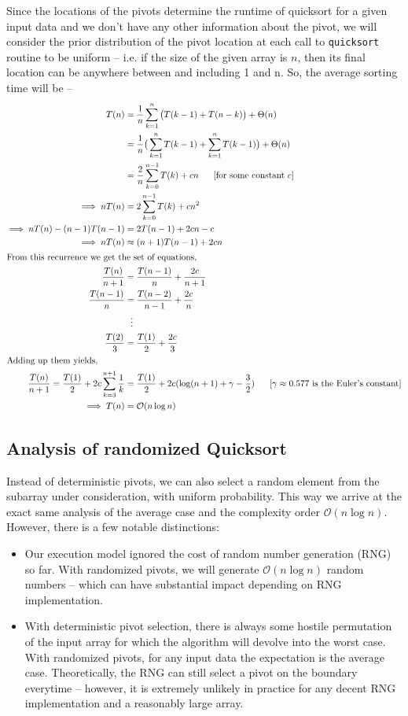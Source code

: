 \documentclass[]{finalproject}
\begin{document}
Since the locations of the pivots determine the runtime of quicksort for a given input data and we don't have any other information about the pivot, we will consider the prior distribution of the pivot location at each call to \texttt{quicksort} routine to be uniform -- i.e. if the size of the given array is $n$, then its final location can be anywhere between and including 1 and n. So, the average sorting time will be --
\begin{align*}
T(n) &= \frac{1}{n}\sum_{k=1}^{n}\big(T(k-1) + T(n-k)\big) + \Theta(n) \\
&= \frac{1}{n}\big(\sum_{k=1}^{n}T(k-1) + \sum_{k=1}^{n}T(k-1)\big) + \Theta(n) \\
&= \frac{2}{n}\sum_{k=0}^{n-1}T(k) + cn ~~~~~[\text{for some constant $c$}]\\
\implies nT(n) &= 2\sum_{k=0}^{n-1}T(k) + cn^2 \\
\implies nT(n) - (n-1)T(n-1) &= 2T(n-1) + 2cn - c \\
\implies nT(n) &\approx (n+1)T(n-1) + 2cn \\
\shortintertext{From this recurrence we get the set of equations,}
\frac{T(n)}{n+1} &= \frac{T(n-1)}{n} + \frac{2c}{n+1} \\
\frac{T(n-1)}{n} &= \frac{T(n-2)}{n-1} + \frac{2c}{n} \\
&~~\vdots \\
\frac{T(2)}{3} &= \frac{T(1)}{2} + \frac{2c}{3} \\
\shortintertext{Adding up them yields,}
\frac{T(n)}{n+1} =  \frac{T(1)}{2} + 2c \sum_{k=3}^{n+1}\frac{1}{k} &= \frac{T(1)}{2} + 2c(\log(n+1) + \gamma - \frac{3}{2}) ~~~~~[\text{$\gamma \approx 0.577$ is the Euler's constant}] \\
\implies T(n) &= \mathcal{O}(n\log n)
\end{align*}

\subsection{Analysis of randomized Quicksort}

Instead of deterministic pivots, we can also select a random element from the subarray under consideration, with uniform probability. This way we arrive at the exact same analysis of the average case and the complexity order $\mathcal{O}(n\log n)$. However, there is a few notable distinctions:
\begin{itemize}
\item Our execution model ignored the cost of random number generation (RNG) so far. With randomized pivots, we will generate $\mathcal{O}(n\log n)$ random numbers -- which can have substantial impact depending on RNG implementation.
\item With deterministic pivot selection, there is always some hostile permutation of the input array for which the algorithm will devolve into the worst case. With randomized pivots, for any input data the expectation is the average case. Theoretically, the RNG can still select a pivot on the boundary everytime -- however, it is extremely unlikely in practice for any decent RNG implementation and a reasonably large array.
\end{itemize}
\end{document}
